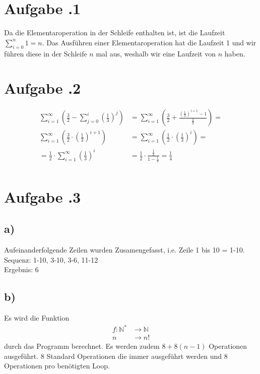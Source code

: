 \documentclass[12pt,german,a4paper]{article}
\author{Giovanni Ngodji Djeuha, Mike Lenz, Jonas Tesfamariam,\\ Bastian Schmitt, Luca Winterkamp}
\begin{document}
	\maketitle
	\section*{Aufgabe \bn.1} 
	
	Da die Elementaroperation in der Schleife enthalten ist, ist die Laufzeit $ \sum ^{ n } _{ i=0 } 1=n $. Das Ausführen einer Elementaroperation hat die Laufzeit 1 und wir führen diese in der Schleife $n$ mal aus, weshalb wir eine Laufzeit von $n$ haben.
	\newpage
	\section*{Aufgabe \bn.2}
	\begin{align*}
	\sum ^{ \infty } _{ i=1 } \left( \frac{ 3 }{ 2 } - \sum ^{ i } _{ j=0 }\left(\frac{ 1 }{ 3 } \right) ^{ j } \right) &= \sum ^{ \infty } _{ i=1 } \left( \frac{ 3 }{ 2 } + \frac{ (\frac{ 1 }{ 3 }) ^{ i+1 } -1  }{ \frac{ 2 }{ 3 }  }  \right) = \\
  \sum ^{ \infty } _{ i=1 } \left( \frac{ 3 }{ 2 } \cdot \left( \frac{ 1 }{ 3 } \right)^{ i+1 }  \right) &= \sum ^{ \infty } _{ i=1 } \left( \frac{ 1 }{ 2 } \cdot \left( \frac{ 1 }{ 3 } \right)^{ i }  \right)= \\
	= \frac{ 1 }{ 2 } \cdot \sum ^{ \infty } _{ i=1 } \left( \frac{ 1 }{ 3 } \right)^{ i } &= \frac{ 1 }{ 2 } \cdot \frac{ \frac{ 1 }{ 3 } }{ 1-\frac{ 1 }{ 3 } } = \frac{ 1 }{ 4 }  \\
	\end{align*}
  \newpage
	\section*{Aufgabe \bn.3}  
	\subsection*{a)}
	Aufeinanderfolgende Zeilen wurden Zusamengefasst, i.e. Zeile 1 bis 10 = 1-10.\\
	Sequenz: 1-10, 3-10, 3-6, 11-12 \\
	Ergebnis: 6
	\subsection*{b)}
	Es wird die Funktion
	\begin{align*}
	f:\mathbb{N} ^{ * } &\rightarrow \mathbb{N} \\
	n &\rightarrow n!
	\end{align*}
	durch das Programm berechnet. Es werden zudem $8+8(n-1)$ Operationen ausgeführt. 8 Standard Operationen die immer ausgeführt werden und 8 Operationen pro benötigten Loop.
\end{document}
